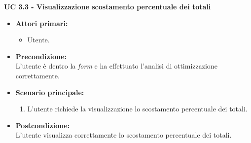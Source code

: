 \vspace{0.4cm}

\noindent \textbf{\large UC 3.3 - Visualizzazione scostamento percentuale dei totali}
\label{uc:visualizzazione-scostamento-percentuale-totali}
\begin{itemize}

	\item \textbf{Attori primari: }
		\begin{itemize}
			\item Utente.
		\end{itemize}

	\item \textbf{Precondizione: }\\[0.3cm]
		L'utente è dentro la \textit{form} e ha effettuato l'analisi di ottimizzazione correttamente.

	\item \textbf{Scenario principale: }
		\begin{enumerate}
			\item L'utente richiede la visualizzazione lo scostamento percentuale dei totali.
		\end{enumerate}
		

	\item \textbf{Postcondizione: }\\[0.3cm]
		L'utente visualizza correttamente lo scostamento percentuale dei totali.

\end{itemize}

\vspace{0.4cm}

\newpage

